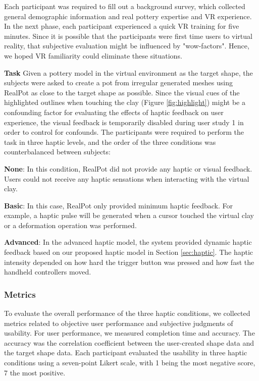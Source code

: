 \documentclass{svjour3}                     %
\begin{document}
Each participant was required to fill out a background survey, which collected general demographic information and real pottery expertise and VR experience.
In the next phase, each participant experienced a quick VR training for five minutes.
Since it is possible that the participants were first time users to virtual reality, that subjective evaluation might be influenced by "wow-factors".
Hence, we hoped VR familiarity could eliminate these situations.

\textbf{Task} Given a pottery model in the virtual environment as the target shape, the subjects were asked to create a pot from irregular generated meshes using RealPot as close to the target shape as possible.
{\color{blue}
Since the visual cues of the highlighted outlines when touching the clay (Figure \ref{fig:highlight}) might be a confounding factor for evaluating the effects of haptic feedback on user experience, the visual feedback is temporarily disabled during user study 1 in order to control for confounds.}
The participants were required to perform the task in three haptic levels, and the order of the three conditions was counterbalanced between subjects:

\textbf{None}: In this condition, RealPot did not provide any haptic or visual feedback. Users could not receive any haptic sensations when interacting with the virtual clay.

\textbf{Basic}: In this case, RealPot only provided minimum haptic feedback. For example, a haptic pulse will be generated when a cursor touched the virtual clay or a deformation operation was performed.

\textbf{Advanced}: In the advanced haptic model, the system provided dynamic haptic feedback based on our proposed haptic model in Section \ref{sec:haptic}. The haptic intensity depended on how hard the trigger button was pressed and how fast the handheld controllers moved.


\subsubsection{Metrics}

To evaluate the overall performance of the three haptic conditions, we collected metrics related to objective user performance and subjective judgments of usability.
%
For user performance, we measured completion time and accuracy. The accuracy was the correlation coefficient between the user-created shape data and the target shape data.
%
Each participant evaluated the usability in three haptic conditions using a seven-point Likert scale, with 1 being the most negative score, 7 the most positive.
\end{document}

